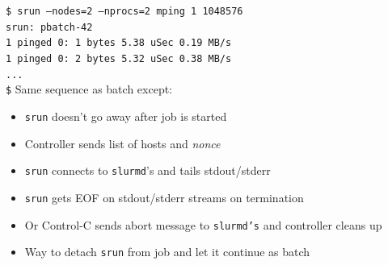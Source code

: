 \documentclass[letter,landscape]{seminar}
\begin{document}
\begin{slide}
  {\tt \$ srun --nodes=2 --nprocs=2 mping 1 1048576}\\
  {\tt srun: pbatch-42}\\
  {\tt 1 pinged   0:        1 bytes      5.38 uSec     0.19 MB/s}\\
  {\tt 1 pinged   0:        2 bytes      5.32 uSec     0.38 MB/s}\\
  {\tt ...}\\
  {\tt \$}
  Same sequence as batch except:
  \begin{itemize}
    \item{{\tt srun} doesn't go away after job is started}
    \item{Controller sends list of hosts and {\em nonce}}
    \item{{\tt srun} connects to {\tt slurmd}'s and tails stdout/stderr}
    \item{{\tt srun} gets EOF on stdout/stderr streams on termination}
    \item{Or Control-C sends abort message to {\tt slurmd's} and 
          controller cleans up}
    \item{Way to detach {\tt srun} from job and let it continue as batch}
  \end{itemize}
\end{slide}
\end{document}
